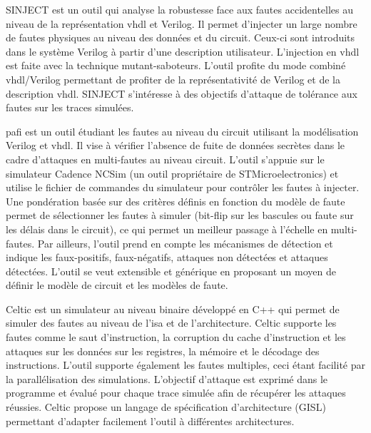                 SINJECT \cite{Zarandi/DFTVS03} est un outil qui analyse la robustesse face aux fautes accidentelles au niveau de la représentation \gls{vhdl} et Verilog. 
                Il permet d'injecter un large nombre de fautes physiques au niveau des données et du circuit. Ceux-ci sont introduits dans le système Verilog à partir d'une description utilisateur. L'injection en \gls{vhdl} est faite avec la technique mutant-saboteurs.
                L'outil profite du mode combiné \gls{vhdl}/Verilog permettant de profiter de la représentativité de Verilog et de la description \gls{vhdl}.
                SINJECT s'intéresse à des objectifs d'attaque de tolérance aux fautes sur les traces simulées.
                
                \gls{pafi} \cite{Faurax/CSS06, Faurax/Phd09} est un outil étudiant les fautes au niveau du circuit utilisant la modélisation Verilog et \gls{vhdl}. 
                Il vise à vérifier l'absence de fuite de données secrètes dans le cadre d'attaques en multi-fautes au niveau circuit.
                L'outil s'appuie sur le simulateur Cadence NCSim (un outil propriétaire de STMicroelectronics) et utilise le fichier de commandes du simulateur pour contrôler les fautes à injecter.
                Une pondération basée sur des critères définis en fonction du modèle de faute permet de sélectionner les fautes à simuler (bit-flip sur les bascules ou faute sur les délais dans le circuit), ce qui permet un meilleur passage à l'échelle en multi-fautes.
                Par ailleurs, l'outil prend en compte les mécanismes de détection et indique les faux-positifs, faux-négatifs, attaques non détectées et attaques détectées.
                L'outil se veut extensible et générique en proposant un moyen de définir le modèle de circuit et les modèles de faute.
                
                \begin{sloppypar}   
                Celtic \cite{Dureuil/Phd16, Werner/Phd22} est un simulateur au niveau binaire développé en C++ qui permet de simuler des fautes au niveau de l'\gls{isa} et de l'architecture.
                Celtic supporte les fautes comme le saut d'instruction, la corruption du cache d'instruction \cite{Riviere/HOST15} et les attaques sur les données sur les registres, la mémoire et le décodage des instructions. L'outil supporte également les fautes multiples, ceci étant facilité par la parallélisation des simulations.
                L'objectif d'attaque est exprimé dans le programme et évalué pour chaque trace simulée afin de récupérer les attaques réussies.
                Celtic propose un langage de spécification d'architecture (GISL) permettant d'adapter facilement l'outil à différentes architectures. 
                \end{sloppypar}   
            
